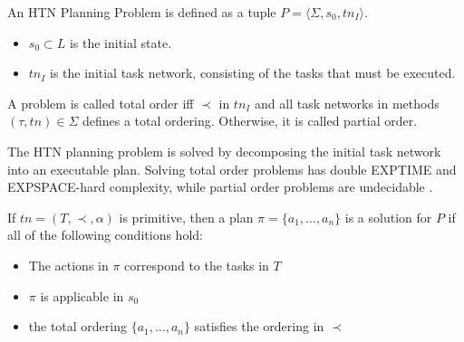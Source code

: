 \begin{definition}
  An HTN Planning Problem is defined as a tuple $P=\langle \Sigma, s_0, tn_I \rangle$.
  \begin{itemize}
    \item $s_0 \subset L$ is the initial state.
    \item $tn_I$ is the initial task network, consisting of the tasks that must be executed.
  \end{itemize}
  A problem is called total order iff $\prec$ in $tn_I$ and all task networks in methods $(\tau,tn) \in \Sigma$ defines a total ordering.
  Otherwise, it is called partial order. 
\end{definition}



The HTN planning problem is solved by decomposing the initial task network into an executable plan.
Solving total order problems has double EXPTIME and EXPSPACE-hard complexity, while partial order problems are undecidable \citep{erolHTNPlanningComplexity1994}.


\begin{definition}
  If $tn = (T,\prec,\alpha)$ is primitive, then a plan $\pi = \{a_1,\dots,a_n\}$ is a solution for $P$ if all of the following conditions hold:
  \begin{itemize}
    \item The actions in $\pi$ correspond to the tasks in $T$
    \item $\pi$ is applicable in $s_0$
    \item the total ordering $\{a_1,\dots,a_n\}$ satisfies the ordering in $\prec$
  \end{itemize}
  \label{def:htn-sol}
\end{definition}

